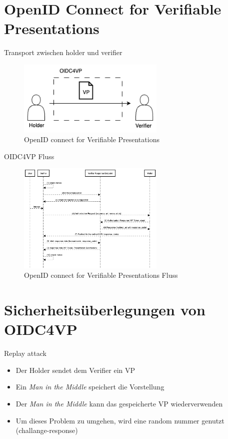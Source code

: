 \documentclass[
	german,%
	authorontitle=true,
	]{bfhbeamer}
\begin{document}
\section{OpenID Connect for Verifiable Presentations}

\begin{frame}{Transport zwischen holder und verifier}
    \begin{figure}
        \centering
        \includegraphics[width=70mm]{../img/OIDC4VP.png}
        \caption{OpenID connect for Verifiable Presentations}
    \end{figure}
\end{frame}

\begin{frame}{OIDC4VP Fluss}
    \begin{figure}
        \centering
        \includegraphics[width=70mm]{../img/OIDC4VPFlow.png}
        \caption{OpenID connect for Verifiable Presentations Fluss}
    \end{figure}
\end{frame}

\section{Sicherheitsüberlegungen von OIDC4VP}

\begin{frame}{Replay attack}
    \begin{itemize}
        \item Der Holder sendet dem Verifier ein VP
        \item Ein \textit{Man in the Middle} speichert die Vorstellung
        \item Der \textit{Man in the Middle} kann das gespeicherte VP wiederverwenden
        \item Um dieses Problem zu umgehen, wird eine random nummer genutzt (challange-response)
    \end{itemize}
\end{frame}
\end{document}
